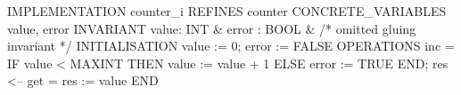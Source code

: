 \documentclass[10pt,a4paper]{article}
\begin{document}
\begin{small}
\begin{pascalcode}
IMPLEMENTATION counter_i
REFINES counter
CONCRETE_VARIABLES value, error
INVARIANT value: INT & error : BOOL & /* omitted gluing invariant */
INITIALISATION  value := 0; error := FALSE
OPERATIONS
    inc = IF value < MAXINT THEN value := value + 1
          ELSE error := TRUE END;
    res <-- get = res := value
END
\end{pascalcode}
\end{small}
\end{document}
